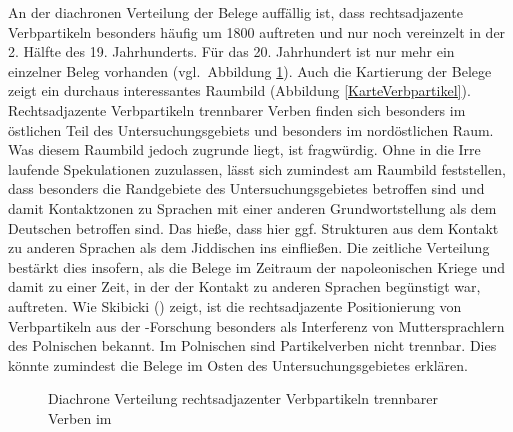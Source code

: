 An der diachronen Verteilung der Belege auffällig ist, dass rechtsadjazente Verbpartikeln besonders häufig um 1800 auftreten und nur noch vereinzelt in der 2. Hälfte des 19. Jahrhunderts. Für das 20. Jahrhundert ist nur mehr ein einzelner Beleg vorhanden (vgl.\, Abbildung \ref{histoparticl}). 
Auch die Kartierung der Belege zeigt ein durchaus interessantes Raumbild (Abbildung \ref{KarteVerbpartikel}). Rechtsadjazente Verbpartikeln trennbarer Verben finden sich besonders im östlichen Teil des Untersuchungsgebiets und besonders im nordöstlichen Raum. Was diesem Raumbild jedoch zugrunde liegt, ist fragwürdig. Ohne in die Irre laufende Spekulationen zuzulassen, lässt sich zumindest am Raumbild feststellen, dass besonders die Randgebiete des Untersuchungsgebietes betroffen sind und damit Kontaktzonen zu Sprachen mit einer anderen Grundwortstellung als dem Deutschen betroffen sind. Das hieße, dass hier ggf. Strukturen aus dem Kontakt zu anderen Sprachen als dem Jiddischen ins \hai{{\LiJieins}} einfließen. Die zeitliche Verteilung bestärkt dies insofern, als die Belege im Zeitraum der napoleonischen Kriege und damit zu einer Zeit, in der der Kontakt zu anderen Sprachen begünstigt war, auftreten. Wie Skibicki (\citeyear[142]{Skibicki2013}) zeigt, ist die rechtsadjazente Positionierung von Verbpartikeln aus der -Forschung besonders als Interferenz von Muttersprachlern des Polnischen  bekannt. Im Polnischen sind Partikelverben nicht trennbar. Dies könnte zumindest die Belege im Osten des Untersuchungsgebietes erklären. 
  \begin{figure}
\fittable{
	\begin{tikzpicture}
		\begin{axis}[only marks, width=0.82\textwidth,height=0.2\textheight,
		legend style={at={(1,1)},xshift=+0.2cm, yshift=-0.0cm,anchor=north west,nodes=left},
			xtick={1700, 1725, 1750, 1775, 1800, 1825, 1850, 1875, 1900, 1925, 1950, 1975}, ytick=\empty,
			x tick label style={/pgf/number format/1000 sep=}, 
			y tick label style={/pgf/number format/1000 sep=},
			extra y tick style={grid=major,
				tick label style={, ,}},
				ymin=0.5,
				ymax=2.5,
			ylabel={Phänomenbelege},
			enlarge x limits=0.03]	
	
		

\addplot  [mark=*, black] table [x=jahr, y=particl] {figures/particl_particl.txt};%
\addplot [mark=o,black] table [x=jahr, y=no] {figures/particl_no.txt};%
 

						\legend{\isi{Partikel} rechtsadjz., keine Manipulation} %
		\end{axis}
	\end{tikzpicture}
}
	\caption{Diachrone Verteilung rechtsadjazenter Verbpartikeln trennbarer Verben im }
	\label{histoparticl}	
\end{figure}
     


